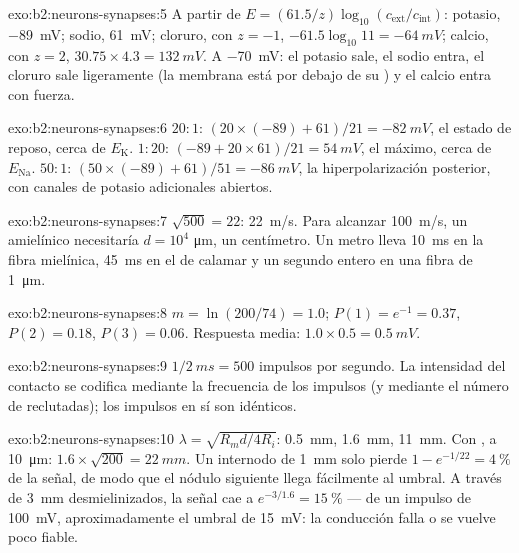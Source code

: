 \begin{solution}{exo:b2:neurons-synapses:5}
A partir de $E = (61.5/z)\log_{10}(c_{\text{ext}}/c_{\text{int}})$:
potasio, \qty{-89}{mV}; sodio, \qty{+61}{mV}; cloruro, con $z =
-1$, $-61.5\log_{10} 11 = \qty{-64}{mV}$; calcio, con $z = 2$,
$30.75\times 4.3 = \qty{+132}{mV}$. A \qty{-70}{mV}: el potasio sale, el
sodio entra, el cloruro sale ligeramente (la membrana está por debajo de
su ) y el calcio entra con fuerza.
\end{solution}

\begin{solution}{exo:b2:neurons-synapses:6}
$20 : 1$: $(20\times(-89) + 61)/21 = \qty{-82}{mV}$, el estado de reposo,
cerca de $E_{\mathrm K}$. $1 : 20$: $(-89 + 20\times 61)/21 =
\qty{+54}{mV}$, el máximo, cerca de $E_{\mathrm{Na}}$. $50 : 1$: $(50\times
(-89) + 61)/51 = \qty{-86}{mV}$, la hiperpolarización posterior, con
canales de potasio adicionales abiertos.
\end{solution}

\begin{solution}{exo:b2:neurons-synapses:7}
$\sqrt{500} = 22$: \qty{22}{m/s}. Para alcanzar \qty{100}{m/s}, un 
amielínico necesitaría $d = 10^{4}$ \unit{\micro m}, un
centímetro. Un metro lleva \qty{10}{ms} en la fibra mielínica,
\qty{45}{ms} en el  de calamar y un segundo entero en una fibra de
\qty{1}{\micro m}.
\end{solution}

\begin{solution}{exo:b2:neurons-synapses:8}
$m = \ln(200/74) = 1.0$; $P(1) = e^{-1} = 0.37$, $P(2) = 0.18$, $P(3)
= 0.06$. Respuesta media: $1.0\times 0.5 = \qty{0.5}{mV}$.
\end{solution}

\begin{solution}{exo:b2:neurons-synapses:9}
$1/\qty{2}{ms} = 500$ impulsos por segundo. La intensidad del contacto se
codifica mediante la frecuencia de los impulsos (y mediante el número de
 reclutadas); los impulsos en sí son idénticos.
\end{solution}

\begin{solution}{exo:b2:neurons-synapses:10}
$\lambda = \sqrt{R_m d/4R_i}$: \qty{0.5}{mm}, \qty{1.6}{mm},
\qty{11}{mm}. Con , a \qty{10}{\micro m}: $1.6\times\sqrt{200} =
\qty{22}{mm}$. Un internodo de \qty{1}{mm} solo pierde $1 - e^{-1/22}
= \qty{4}{\%}$ de la señal, de modo que el nódulo siguiente llega
fácilmente al umbral. A través de \qty{3}{mm} desmielinizados, la señal
cae a $e^{-3/1.6} = \qty{15}{\%}$ --- de un impulso de \qty{100}{mV},
aproximadamente el umbral de \qty{15}{mV}: la conducción falla o se vuelve
poco fiable.
\end{solution}

